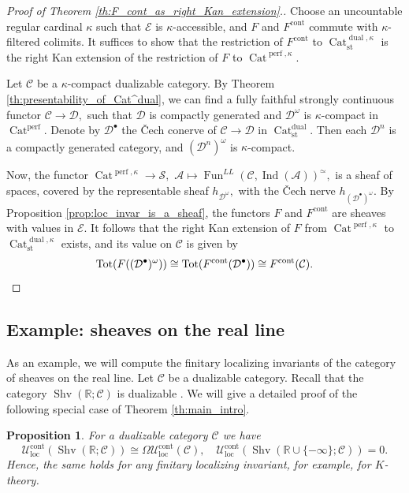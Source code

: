 \documentclass[11pt,leqno]{amsart}
\newtheorem{prop}[theo]{Proposition}
\numberwithin{equation}{section}
\def\R{\mathbb{R}}
\newcommand{\Cat}{\operatorname{Cat}}
\newcommand{\loc}{\operatorname{loc}}
\newcommand{\cont}{\operatorname{cont}}
\newcommand{\st}{\operatorname{st}}
\newcommand{\dual}{\operatorname{dual}}
\newcommand{\cD}{{\mathcal D}}
\newcommand{\cA}{{\mathcal A}}
\newcommand{\cC}{{\mathcal C}}
\newcommand{\cE}{{\mathcal E}}
\newcommand{\cU}{{\mathcal U}}
\newcommand{\cS}{{\mathcal S}}
\newcommand{\Fun}{\operatorname{Fun}}
\newcommand{\Tot}{\operatorname{Tot}}
\newcommand{\perf}{\operatorname{perf}}
\newcommand{\Sh}{\operatorname{Shv}}
\newcommand{\Ind}{\operatorname{Ind}}
\begin{document}
\begin{proof}[Proof of Theorem \ref{th:F_cont_as_right_Kan_extension}.] Choose an uncountable regular cardinal $\kappa$ such that $\cE$ is $\kappa$-accessible, and $F$ and $F^{\cont}$ commute with $\kappa$-filtered colimits. It suffices to show that the restriction of $F^{\cont}$ to $\Cat_{\st}^{\dual,\kappa}$ is the right Kan extension of the restriction of $F$ to $\Cat^{\perf,\kappa}.$ 

Let $\cC$ be a $\kappa$-compact dualizable category. By Theorem \ref{th:presentability_of_Cat^dual}, we can find a fully faithful  strongly continuous functor $\cC\to\cD,$ such that $\cD$ is compactly generated and $\cD^{\omega}$ is $\kappa$-compact in $\Cat^{\perf}.$ Denote by $\cD^{\bullet}$ the \v{C}ech conerve of $\cC\to\cD$ in $\Cat_{\st}^{\dual}.$ Then each $\cD^n$ is a compactly generated category, and $(\cD^n)^{\omega}$ is $\kappa$-compact.

Now, the functor $\Cat^{\perf,\kappa}\to\cS,$ $\cA\mapsto \Fun^{LL}(\cC,\Ind(\cA))^{\simeq},$ is a sheaf of spaces, covered by the representable sheaf $h_{\cD^{\omega}},$ with the \v{C}ech nerve $h_{(\cD^{\bullet})^{\omega}}.$ By Proposition  \ref{prop:loc_invar_is_a_sheaf}, the functors $F$ and $F^{\cont}$ are sheaves with values in $\cE.$ It follows that the right Kan extension of $F$ from $\Cat^{\perf,\kappa}$ to $\Cat_{\st}^{\dual,\kappa}$ exists, and its value on $\cC$ is given by
\begin{equation*} \Tot(F((\cD^{\bullet})^{\omega}))\cong \Tot(F^{\cont}(\cD^{\bullet}))\cong F^{\cont}(\cC).\qedhere\end{equation*}
\end{proof}

\subsection{Example: sheaves on the real line}
\label{ssec:sheaves_on_R}

As an example, we will compute the finitary localizing invariants of the category of sheaves on the real line. Let $\cC$ be a dualizable category. Recall that the category $\Sh(\R;\cC)$ is dualizable \cite{Lur18}. We will give a detailed proof of the following special case of Theorem \ref{th:main_intro}.

\begin{prop}\label{prop:U_loc_sheaves_on_R} For a dualizable category $\cC$ we have
$$\cU_{\loc}^{\cont}(\Sh(\R;\cC))\cong\Omega \cU_{\loc}^{\cont}(\cC), \quad \cU_{\loc}^{\cont}(\Sh(\R\cup\{-\infty\};\cC))=0.$$ Hence, the same holds for any finitary localizing invariant, for example, for $K$-theory.
\end{prop}
\end{document}
